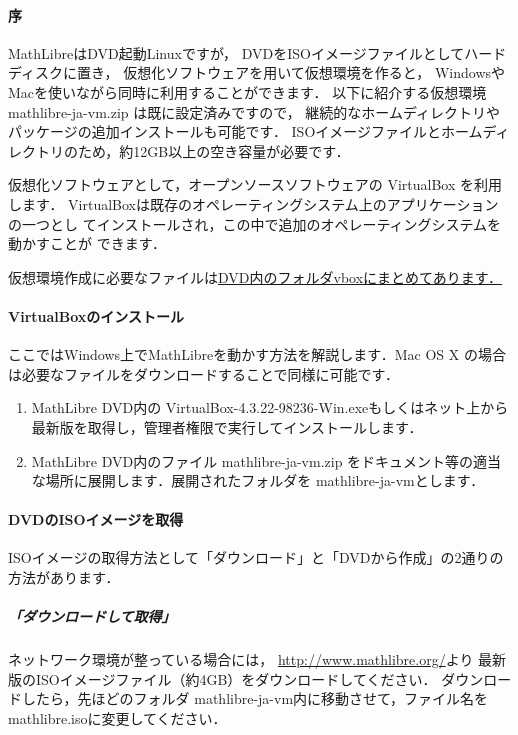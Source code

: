 \documentclass[a4,twocolumn]{jsarticle}
\newcommand{\vboxwin}{VirtualBox-4.3.22-98236-Win.exe}
\newcommand{\vm}{mathlibre-ja-vm}
\begin{document}
\paragraph{序}
MathLibreはDVD起動Linuxですが，
DVDをISOイメージファイルとしてハードディスクに置き，
仮想化ソフトウェアを用いて仮想環境を作ると，
WindowsやMacを使いながら同時に利用することができます．
以下に紹介する仮想環境 \vm.zip は既に設定済みですので，
継続的なホームディレクトリやパッケージの追加インストールも可能です．
ISOイメージファイルとホームディレクトリのため，約12GB以上の空き容量が必要です．

仮想化ソフトウェアとして，オープンソースソフトウェアの VirtualBox を利用します．
VirtualBoxは既存のオペレーティングシステム上のアプリケーションの一つとし
てインストールされ，この中で追加のオペレーティングシステムを動かすことが
できます．

仮想環境作成に必要なファイルは\underline{DVD内のフォルダvboxにまとめてあります．}\paragraph{VirtualBoxのインストール}
ここではWindows上でMathLibreを動かす方法を解説します．Mac OS X の場合は必要なファイルをダウンロードすることで同様に可能です．
\begin{enumerate}
 \item MathLibre DVD内の \vboxwin もしくはネット上から最新版を取得し，管理者権限で実行してインストールします．
 \item MathLibre DVD内のファイル \vm.zip をドキュメント等の適当な場所に展開します．展開されたフォルダを \vm とします．
\end{enumerate}

\paragraph{DVDのISOイメージを取得}
ISOイメージの取得方法として「ダウンロード」と「DVDから作成」の2通りの方法があります．
\subparagraph{「ダウンロードして取得」}
ネットワーク環境が整っている場合には，
\url{http://www.mathlibre.org/}より
最新版のISOイメージファイル（約4GB）をダウンロードしてください．
ダウンロードしたら，先ほどのフォルダ \vm 内に移動させて，ファイル名をmathlibre.isoに変更してください．
\end{document}
